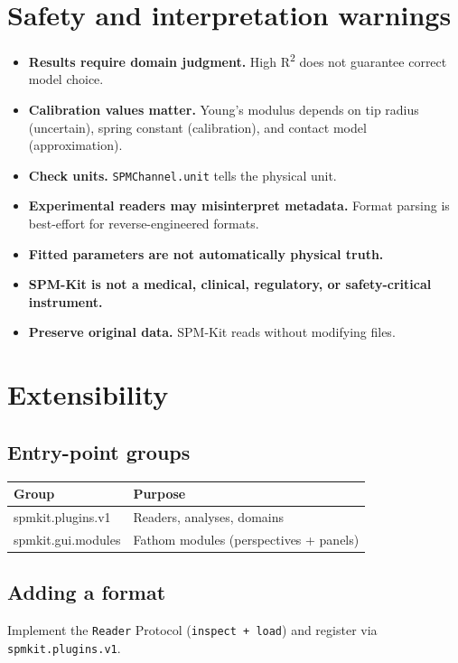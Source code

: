 \documentclass[a4paper,11pt]{article}
\begin{document}
\section{Safety and interpretation warnings}

\begin{itemize}
  \item \textbf{Results require domain judgment.} High R\textsuperscript{2} does not guarantee correct model choice.
  \item \textbf{Calibration values matter.} Young's modulus depends on tip radius (uncertain),
    spring constant (calibration), and contact model (approximation).
  \item \textbf{Check units.} \texttt{SPMChannel.unit} tells the physical unit.
  \item \textbf{Experimental readers may misinterpret metadata.} Format parsing is
    best-effort for reverse-engineered formats.
  \item \textbf{Fitted parameters are not automatically physical truth.}
  \item \textbf{SPM-Kit is not a medical, clinical, regulatory, or safety-critical instrument.}
  \item \textbf{Preserve original data.} SPM-Kit reads without modifying files.
\end{itemize}

\section{Extensibility}

\subsection{Entry-point groups}

\begin{tabularx}{\linewidth}{@{}>{\ttfamily}l X@{}}
\toprule
Group & Purpose \\
\midrule
spmkit.plugins.v1 & Readers, analyses, domains \\
spmkit.gui.modules & Fathom modules (perspectives + panels) \\
\bottomrule
\end{tabularx}

\subsection{Adding a format}
Implement the \texttt{Reader} Protocol (\texttt{inspect + load}) and register via
\texttt{spmkit.plugins.v1}.
\end{document}
